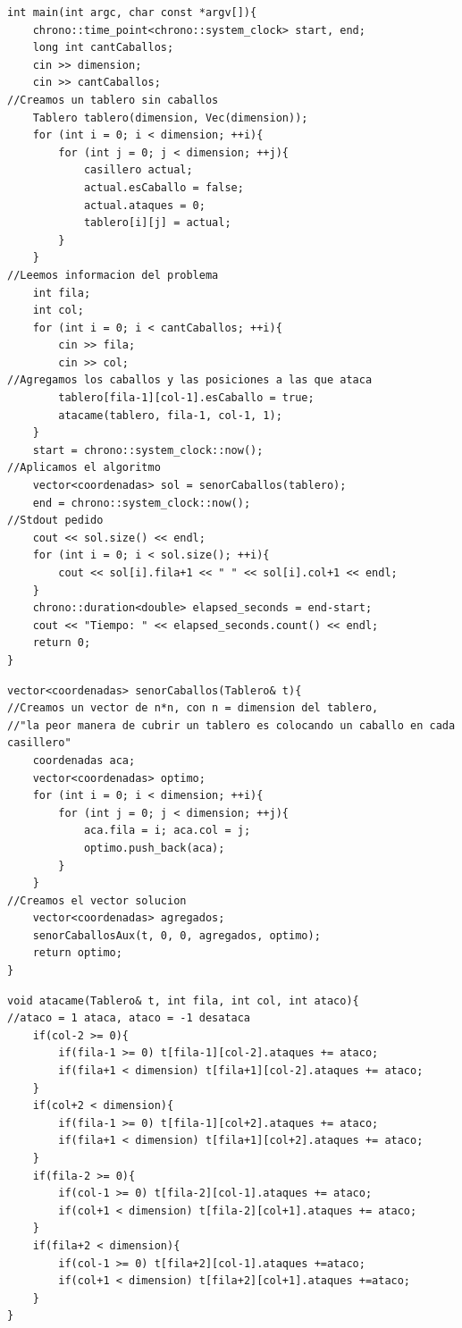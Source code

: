 	\begin{codesnippet}
	\begin{verbatim}
int main(int argc, char const *argv[]){
    chrono::time_point<chrono::system_clock> start, end;
    long int cantCaballos;
    cin >> dimension;
    cin >> cantCaballos;
//Creamos un tablero sin caballos
    Tablero tablero(dimension, Vec(dimension));
    for (int i = 0; i < dimension; ++i){
        for (int j = 0; j < dimension; ++j){
            casillero actual;
            actual.esCaballo = false;
            actual.ataques = 0;
            tablero[i][j] = actual;
        }
    }
//Leemos informacion del problema
    int fila;
    int col;
    for (int i = 0; i < cantCaballos; ++i){
        cin >> fila;
        cin >> col;
//Agregamos los caballos y las posiciones a las que ataca
        tablero[fila-1][col-1].esCaballo = true;
        atacame(tablero, fila-1, col-1, 1);
    }
    start = chrono::system_clock::now();
//Aplicamos el algoritmo
    vector<coordenadas> sol = senorCaballos(tablero);
    end = chrono::system_clock::now();
//Stdout pedido
    cout << sol.size() << endl;
    for (int i = 0; i < sol.size(); ++i){
        cout << sol[i].fila+1 << " " << sol[i].col+1 << endl;
    }
    chrono::duration<double> elapsed_seconds = end-start;
    cout << "Tiempo: " << elapsed_seconds.count() << endl;
    return 0;
}
	\end{verbatim}
	\end{codesnippet}
\newpage
	\begin{codesnippet}
	\begin{verbatim}
vector<coordenadas> senorCaballos(Tablero& t){
//Creamos un vector de n*n, con n = dimension del tablero, 
//"la peor manera de cubrir un tablero es colocando un caballo en cada casillero"
    coordenadas aca;
    vector<coordenadas> optimo;
    for (int i = 0; i < dimension; ++i){
        for (int j = 0; j < dimension; ++j){
            aca.fila = i; aca.col = j;
            optimo.push_back(aca);
        }
    }
//Creamos el vector solucion
    vector<coordenadas> agregados;
    senorCaballosAux(t, 0, 0, agregados, optimo);
    return optimo;
}
	\end{verbatim}
	\end{codesnippet}

	\begin{codesnippet}
	\begin{verbatim}
void atacame(Tablero& t, int fila, int col, int ataco){
//ataco = 1 ataca, ataco = -1 desataca
    if(col-2 >= 0){
        if(fila-1 >= 0) t[fila-1][col-2].ataques += ataco;
        if(fila+1 < dimension) t[fila+1][col-2].ataques += ataco;
    }
    if(col+2 < dimension){
        if(fila-1 >= 0) t[fila-1][col+2].ataques += ataco;
        if(fila+1 < dimension) t[fila+1][col+2].ataques += ataco;
    }
    if(fila-2 >= 0){
        if(col-1 >= 0) t[fila-2][col-1].ataques += ataco;
        if(col+1 < dimension) t[fila-2][col+1].ataques += ataco;
    }
    if(fila+2 < dimension){
        if(col-1 >= 0) t[fila+2][col-1].ataques +=ataco;
        if(col+1 < dimension) t[fila+2][col+1].ataques +=ataco;
    }
}
	\end{verbatim}
	\end{codesnippet}

